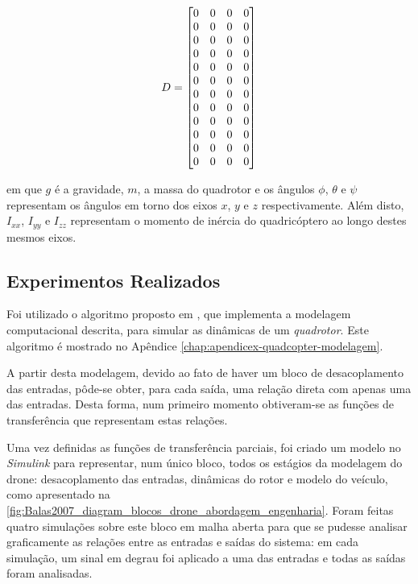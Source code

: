\begin{equation*}
D =
\left[\begin{array}{@{}*{4}{c}@{}}
	0 & 0 & 0 & 0 \\
	0 & 0 & 0 & 0 \\
	0 & 0 & 0 & 0 \\
	0 & 0 & 0 & 0 \\
	0 & 0 & 0 & 0 \\
	0 & 0 & 0 & 0 \\
	0 & 0 & 0 & 0 \\
	0 & 0 & 0 & 0 \\
	0 & 0 & 0 & 0 \\
	0 & 0 & 0 & 0 \\
	0 & 0 & 0 & 0 \\
	0 & 0 & 0 & 0 \\
\end{array}\right]
\end{equation*}

em que $g$ é a gravidade, $m$, a massa do quadrotor e os ângulos $\phi$, $\theta$ e $\psi$ representam os ângulos em torno dos eixos $x$, $y$ e $z$ respectivamente. Além disto, $I_{xx}$, $I_{yy}$ e $I_{zz}$ representam o momento de inércia do quadricóptero ao longo destes mesmos eixos.

\subsection{Experimentos Realizados}
\label{subsec:metodolgoia-quadcopter-experimentos}

Foi utilizado o algoritmo proposto em , que implementa a modelagem computacional descrita,  para simular as dinâmicas de um \textit{quadrotor}. Este algoritmo é mostrado no Apêndice \ref{chap:apendicex-quadcopter-modelagem}. 

A partir desta modelagem, devido ao fato de haver um bloco de desacoplamento das entradas, pôde-se obter, para cada saída, uma relação direta com apenas uma das entradas. Desta forma, num primeiro momento obtiveram-se as funções de transferência que representam estas relações. 

Uma vez definidas as funções de transferência parciais, foi criado um modelo no \textit{Simulink} para representar, num único bloco, todos os estágios da modelagem do drone: desacoplamento das entradas, dinâmicas do rotor e modelo do veículo, como apresentado na \autoref{fig:Balas2007_diagram_blocos_drone_abordagem_engenharia}. Foram feitas quatro simulações sobre este bloco em malha aberta para que se pudesse analisar graficamente as relações entre as entradas e saídas do sistema: em cada simulação, um sinal em degrau foi aplicado a uma das entradas e todas as saídas foram analisadas.

